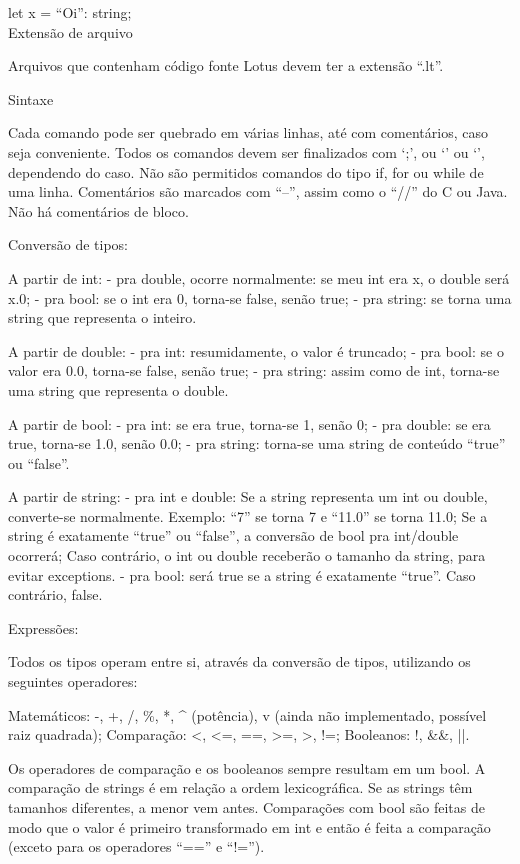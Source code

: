 \documentclass[12pt,a4paper]{article}
\begin{document}
let x = ``Oi'': string;\\


Extensão de arquivo

Arquivos que contenham código fonte Lotus devem ter a extensão ``.lt''.


Sintaxe

Cada comando pode ser quebrado em várias linhas, até com comentários, caso seja conveniente. Todos os comandos devem ser finalizados com `;', ou `{' ou `}', dependendo do caso. Não são permitidos comandos do tipo if, for ou while de uma linha.
Comentários são marcados com ``--'', assim como o ``//'' do C ou Java. Não há comentários de bloco.


Conversão de tipos:

A partir de int:
- pra double, ocorre normalmente: se meu int era x, o double será x.0;
- pra bool: se o int era 0, torna-se false, senão true;
- pra string: se torna uma string que representa o inteiro.

A partir de double:
- pra int: resumidamente, o valor é truncado;
- pra bool: se o valor era 0.0, torna-se false, senão true;
- pra string: assim como de int, torna-se uma string que representa o double.

A partir de bool:
- pra int: se era true, torna-se 1, senão 0;
- pra double: se era true, torna-se 1.0, senão 0.0;
- pra string: torna-se uma string de conteúdo ``true'' ou ``false''.

A partir de string:
- pra int e double:
Se a string representa um int ou double, converte-se normalmente. Exemplo: ``7'' se torna 7 e ``11.0'' se torna 11.0;
Se a string é exatamente ``true'' ou ``false'', a conversão de bool pra int/double ocorrerá;
Caso contrário, o int ou double receberão o tamanho da string, para evitar exceptions.
- pra bool: será true se a string é exatamente ``true''. Caso contrário, false.


Expressões:

Todos os tipos operam entre si, através da conversão de tipos, utilizando os seguintes operadores:

Matemáticos: -, +, /, \%, *, ^ (potência), v (ainda não implementado, possível raiz quadrada);
Comparação: <, <=, ==, >=, >, !=;
Booleanos: !, &&, ||.

Os operadores de comparação e os booleanos sempre resultam em um bool. A comparação de strings é em relação a ordem lexicográfica. Se as strings têm tamanhos diferentes, a menor vem antes. Comparações com bool são feitas de modo que o valor é primeiro transformado em int e então é feita a comparação (exceto para os operadores ``=='' e ``!='').
\end{document}

